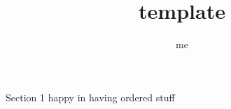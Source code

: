 \documentclass[9pt]{article}
\title {template}
\author {me}
\theoremstyle{definition}
\theoremstyle{remark}
\begin{document}
\maketitle
\begin{section}{Section 1}
happy in having ordered stuff
\end{section}
\end{document}
